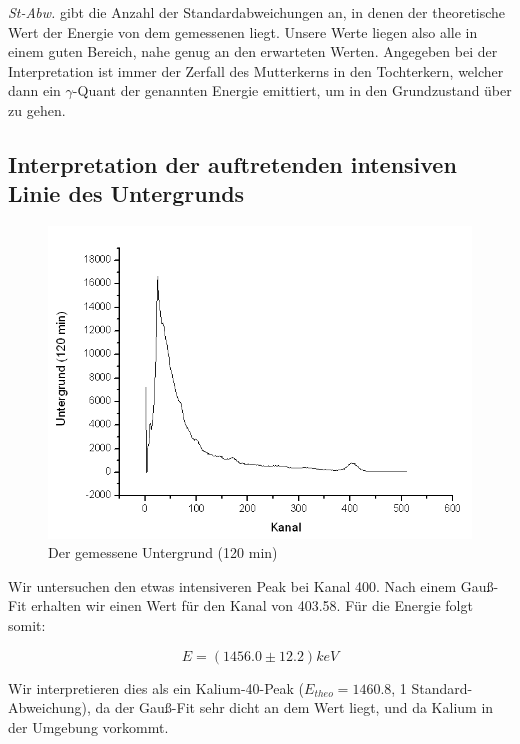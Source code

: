 \emph{St-Abw.} gibt die Anzahl der Standardabweichungen an, in denen der theoretische Wert der Energie von dem gemessenen liegt. Unsere Werte liegen also alle in einem guten Bereich, nahe genug an den erwarteten Werten. Angegeben bei der Interpretation ist immer der Zerfall des Mutterkerns in den Tochterkern, welcher dann ein $\gamma$-Quant der genannten Energie emittiert, um in den Grundzustand über zu gehen.


\subsection{Interpretation der auftretenden intensiven Linie des Untergrunds}

\begin{figure}[H]
\centering \includegraphics[width = \textwidth]{auswertung/UG1.png}
\caption{Der gemessene Untergrund (120 min)}
\end{figure}

Wir untersuchen den etwas intensiveren Peak bei Kanal 400. Nach einem Gauß-Fit erhalten wir einen Wert für den Kanal von 403.58. Für die Energie folgt somit:

$$E = (1456.0 \pm 12.2) keV $$

Wir interpretieren dies als ein Kalium-40-Peak ($E_{theo} = 1460.8$, 1 Standard-Abweichung), da der Gauß-Fit sehr dicht an dem Wert liegt, und da Kalium in der Umgebung vorkommt.

